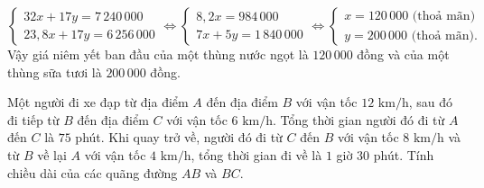 \begin{bt}
{$$ \begin{cases} 32x + 17y = 7\,240\,000 \\ 23{,}8x + 17y = 6\,256\,000 \end{cases} \iff \begin{cases} 8{,}2x = 984\,000 \\ 7x + 5y = 1\,840\,000 \end{cases} \iff \begin{cases} x = 120\,000\text{ (thoả mãn)} \\ y = 200\,000\text{ (thoả mãn)}. \end{cases} $$
Vậy giá niêm yết ban đầu của một thùng nước ngọt là $120\,000$ đồng và của một thùng sữa tươi là $200\,000$ đồng.
}
\end{bt}

\begin{bt}%
Một người đi xe đạp từ địa điểm $A$ đến địa điểm $B$ với vận tốc $12\text{ km/h}$, sau đó đi tiếp từ $B$ đến địa điểm $C$ với vận tốc $6\text{ km/h}$. Tổng thời gian người đó đi từ $A$ đến $C$ là $75$ phút. Khi quay trở về, người đó đi từ $C$ đến $B$ với vận tốc $8\text{ km/h}$ và từ $B$ về lại $A$ với vận tốc $4\text{ km/h}$, tổng thời gian đi về là $1$ giờ $30$ phút. Tính chiều dài của các quãng đường $AB$ và $BC$.
\end{bt}

